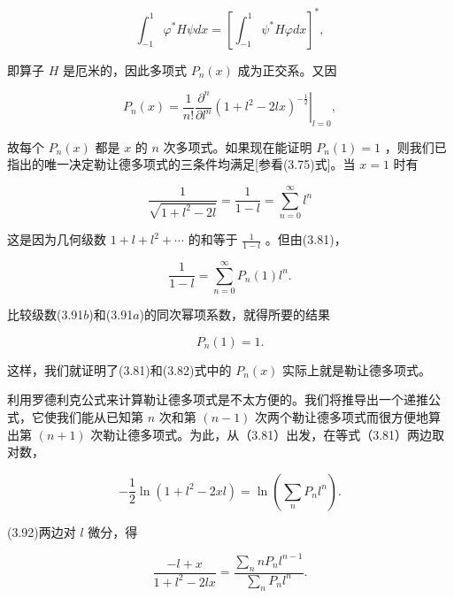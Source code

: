\begin{equation*}
\int_ {- 1} ^ {1} \varphi^ {*} H \psi d x = \left[ \int_ {- 1} ^ {1} \psi^ {*} H \varphi d x \right] ^ {*},
\end{equation*}

即算子 $H$ 是厄米的，因此多项式 $P_{n}(x)$ 成为正交系。又因

\begin{equation*}
P _ {n} (x) = \frac {1}{n !} \left. \frac {\partial^ {n}}{\partial l ^ {n}} (1 + l ^ {2} - 2 l x) ^ {- \frac {1}{2}} \right| _ {l = 0},
\end{equation*}

故每个 $P_{n}(x)$ 都是 $x$ 的 $n$ 次多项式。如果现在能证明 $P_{n}(1) = 1$ ，则我们已指出的唯一决定勒让德多项式的三条件均满足[参看(3.75)式]。当 $x = 1$ 时有

\begin{equation*}
\frac {1}{\sqrt {1 + l ^ {2} - 2 l}} = \frac {1}{1 - l} = \sum_ {n = 0} ^ {\infty} l ^ {n}\tag{3.91a}
\end{equation*}

这是因为几何级数 $1 + l + l^2 + \cdots$ 的和等于 $\frac{1}{1 - l}$ 。但由(3.81)，

\begin{equation*}
\frac {1}{1 - l} = \sum_ {n = 0} ^ {\infty} P _ {n} (1) l ^ {n}.\tag{3.91b}
\end{equation*}

比较级数(3.91$b$)和(3.91$a$)的同次幂项系数，就得所要的结果

\begin{equation*}
P _ {n} (1) = 1.
\end{equation*}

这样，我们就证明了(3.81)和(3.82)式中的 $P_{n}(x)$ 实际上就是勒让德多项式。

利用罗德利克公式来计算勒让德多项式是不太方便的。我们将推导出一个递推公式，它使我们能从已知第 $n$ 次和第 $(n - 1)$ 次两个勒让德多项式而很方便地算出第 $(n + 1)$ 次勒让德多项式。为此，从（3.81）出发，在等式（3.81）两边取对数，

\begin{equation*}
- \frac {1}{2} \ln (1 + l ^ {2} - 2 x l) = \ln (\sum_ {n} P _ {n} l ^ {n}).\tag{3.92}
\end{equation*}

(3.92)两边对 $l$ 微分，得

\begin{equation*}
\frac {- l + x}{1 + l ^ {2} - 2 l x} = \frac {\sum_ {n} n P _ {n} l ^ {n - 1}}{\sum_ {n} P _ {n} l ^ {n}}.\tag{3.93}
\end{equation*}

